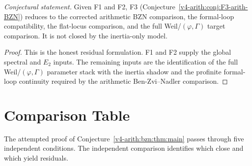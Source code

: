 \begin{corollary}
\label{v4-arith:bzn:cor:F3-closes}
\emph{Conjectural statement.} Given F1 and F2, F3
(Conjecture~\ref{v4-arith:conj:F3-arith-BZN}) reduces to the corrected
arithmetic BZN comparison, the formal-loop compatibility, the
flat-locus comparison, and the full Weil/\((\varphi,\Gamma)\) target
comparison. It is not closed by the inertia-only model.
\end{corollary}

\begin{proof}
This is the honest residual formulation. F1 and F2 supply the
global spectral and \(E_{2}\) inputs. The remaining inputs are the
identification of the full Weil/\((\varphi,\Gamma)\) parameter stack
with the inertia shadow and the profinite formal-loop continuity
required by the arithmetic Ben-Zvi--Nadler comparison.
\end{proof}

\section{Comparison Table}
\label{v4-arith:bzn:table}

The attempted proof of Conjecture~\ref{v4-arith:bzn:thm:main} passes through
five independent conditions. The independent comparison identifies
which close and which yield residuals.

